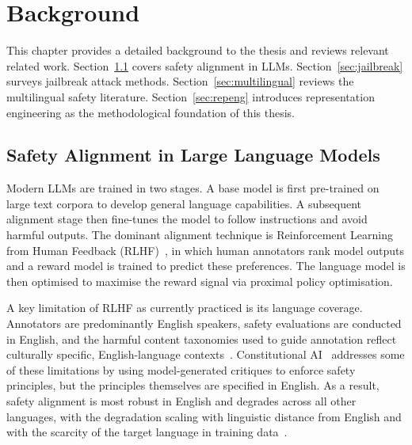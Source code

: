 \chapter{Background}
\label{chap:background}

This chapter provides a detailed background to the thesis and reviews relevant related work. Section~\ref{sec:align} covers safety alignment in LLMs. Section~\ref{sec:jailbreak} surveys jailbreak attack methods. Section~\ref{sec:multilingual} reviews the multilingual safety literature. Section~\ref{sec:repeng} introduces representation engineering as the methodological foundation of this thesis.

\section{Safety Alignment in Large Language Models}
\label{sec:align}

Modern LLMs are trained in two stages. A base model is first pre-trained on large text corpora to develop general language capabilities. A subsequent alignment stage then fine-tunes the model to follow instructions and avoid harmful outputs. The dominant alignment technique is Reinforcement Learning from Human Feedback (RLHF)~\citep{ouyang2022training}, in which human annotators rank model outputs and a reward model is trained to predict these preferences. The language model is then optimised to maximise the reward signal via proximal policy optimisation.

A key limitation of RLHF as currently practiced is its language coverage. Annotators are predominantly English speakers, safety evaluations are conducted in English, and the harmful content taxonomies used to guide annotation reflect culturally specific, English-language contexts~\citep{krasnodkebska2026safety}. Constitutional AI~\citep{bai2022constitutional} addresses some of these limitations by using model-generated critiques to enforce safety principles, but the principles themselves are specified in English. As a result, safety alignment is most robust in English and degrades across all other languages, with the degradation scaling with linguistic distance from English and with the scarcity of the target language in training data~\citep{wang2024all, shen2024language}.

